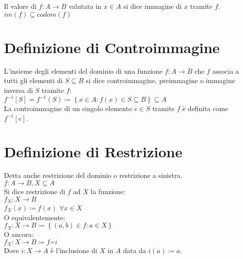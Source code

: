 \documentclass[a4paper, twoside, italian, 11pt]{book}
\newcommand{\braces}[1] {\left \{ #1 \right \}}
\begin{document}
\noindent
Il valore di $f : A \rightarrow B$ valutata in $x \in A$ si dice immagine di $x$ tramite $f$. \\

\noindent
$im(f) \subseteq codom(f)$



\section{Definizione di Controimmagine}

L'insieme degli elementi del dominio di una funzione $f : A \rightarrow B$ che $f$ associa a tutti gli elementi di $S \subseteq B$ si dice controimmagine, preimmagine o immagine inversa di $S$ tramite $f$: \\

$f^{-1}[S] = f^{-1}(S) \coloneqq \braces{x \in A : f(x) \in S \subseteq B} \subseteq A$ \\

\noindent
La controimmagine di un singolo elemento $e \in S$ tramite $f$ è definita come $f^{-1}[{e}]$.



\section{Definizione di Restrizione}

Detta anche restrizione del dominio o restrizione a sinistra. \\

\noindent
$f : A \rightarrow B, X \subseteq A$ \\

\noindent
Si dice restrizione di $f$ ad $X$ la funzione: \\

$f_X : X \rightarrow B$ \\
\indent
$f_X(x) \coloneqq f(x)$ $\forall x \in X$ \\

\noindent
O equivalentemente: \\

$f_X : X \rightarrow B \coloneqq \braces{(a, b) \in f : a \in X}$ \\

\noindent
O ancora: \\

$f_X : X \rightarrow B \coloneqq f \circ i$ \\

\noindent
Dove $i : X \rightarrow A$ è l'inclusione di $X$ in $A$ data da $i(a) \coloneqq a$. \\
\end{document}
